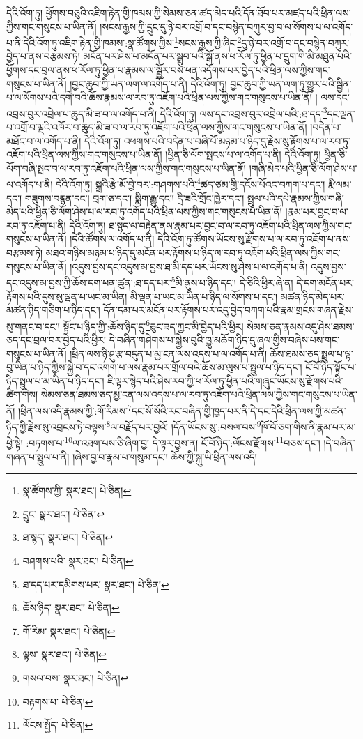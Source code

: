 དེའི་འོག་ཏུ། ཕྱོགས་བཅུའི་འཇིག་རྟེན་གྱི་ཁམས་ཀྱི་སེམས་ཅན་ཚད་མེད་པའི་དོན་ཐོབ་པར་མཛད་པའི་ཕྲིན་ལས་ཀྱིས་གང་གསུངས་པ་ཡིན་ནོ། །སངས་རྒྱས་ཀྱི་དྲུང་དུ་ཉེ་བར་འགྲོ་བ་དང་བསྙེན་བཀུར་བྱ་བ་ལ་སོགས་པ་ལ་འགོད་པ་ནི་དེའི་འོག་ཏུ་འཇིག་རྟེན་གྱི་ཁམས་:སྣ་ཚོགས་ཀྱིས་\footnote{སྣ་ཚོགས་ཀྱི་  སྣར་ཐང་།  པེ་ཅིན། }སངས་རྒྱས་ཀྱི་ཞིང་\footnote{དྲུང་  སྣར་ཐང་།  པེ་ཅིན། }དུ་ཉེ་བར་འགྲོ་བ་དང་བསྙེན་བཀུར་བྱེད་པ་ནས་བརྩམས་ཏེ། མངོན་པར་ཤེས་པ་མངོན་པར་སྒྲུབ་པའི་སྒོ་ནས་ཕ་རོལ་ཏུ་ཕྱིན་པ་དྲུག་གི་མི་མཐུན་པའི་ཕྱོགས་དང་བྲལ་ནས་ཕ་རོལ་ཏུ་ཕྱིན་པ་རྣམས་ལ་སྦྱོར་བས་ཕན་འདོགས་པར་བྱེད་པའི་ཕྲིན་ལས་ཀྱིས་གང་གསུངས་པ་ཡིན་ནོ། །བྱང་ཆུབ་ཀྱི་ཡན་ལག་ལ་འགོད་པ་ནི། དེའི་འོག་ཏུ། བྱང་ཆུབ་ཀྱི་ཡན་ལག་ཏུ་གྱུར་པའི་སྦྱིན་པ་ལ་སོགས་པའི་དགེ་བའི་ཆོས་རྣམས་ལ་རབ་ཏུ་འཇོག་པའི་ཕྲིན་ལས་ཀྱིས་གང་གསུངས་པ་ཡིན་ནོ། །
ལས་དང་འབྲས་བུར་འབྲེལ་པ་ཆུད་མི་ཟ་བ་ལ་འགོད་པ་ནི། དེའི་འོག་ཏུ། ལས་དང་འབྲས་བུར་འབྲེལ་པའི་:ཐ་དད་\footnote{ཐ་སྙད་  སྣར་ཐང་།  པེ་ཅིན། }དང་ལྡན་པ་འགྲོ་བ་ལྔའི་འཁོར་བ་ཆུད་མི་ཟ་བ་ལ་རབ་ཏུ་འཇོག་པའི་ཕྲིན་ལས་ཀྱིས་གང་གསུངས་པ་ཡིན་ནོ། །བདེན་པ་མཐོང་བ་ལ་འགོད་པ་ནི། དེའི་འོག་ཏུ། འཕགས་པའི་བདེན་པ་བཞི་པོ་མཉམ་པ་ཉིད་དུ་རྗེས་སུ་རྟོགས་པ་ལ་རབ་ཏུ་འཇོག་པའི་ཕྲིན་ལས་ཀྱིས་གང་གསུངས་པ་ཡིན་ནོ། །ཕྱིན་ཅི་ལོག་སྤངས་པ་ལ་འགོད་པ་ནི། དེའི་འོག་ཏུ། ཕྱིན་ཅི་ལོག་བཞི་སྤང་བ་ལ་རབ་ཏུ་འཇོག་པའི་ཕྲིན་ལས་ཀྱིས་གང་གསུངས་པ་ཡིན་ནོ། །གཞི་མེད་པའི་ཕྱིན་ཅི་ལོག་ཤེས་པ་ལ་འགོད་པ་ནི། དེའི་འོག་ཏུ། སྐྲའི་རྩེ་མོ་བྱེ་བར་:གཤགས་པའི་\footnote{བཤགས་པའི་  སྣར་ཐང་།  པེ་ཅིན། }ཚད་ཙམ་གྱི་དངོས་པོའང་བཀག་པ་དང་། རྨི་ལམ་དང་། གཟུགས་བརྙན་དང་། བྲག་ཅ་དང་། སྨིག་རྒྱུ་དང་། དྲི་ཟའི་གྲོང་ཁྱེར་དང་། སྤྲུལ་པའི་དཔེ་རྣམས་ཀྱིས་གཞི་མེད་པའི་ཕྱིན་ཅི་ལོག་ཤེས་པ་ལ་རབ་ཏུ་འགོད་པའི་ཕྲིན་ལས་ཀྱིས་གང་གསུངས་པ་ཡིན་ནོ། །རྣམ་པར་བྱང་བ་ལ་རབ་ཏུ་འཇོག་པ་ནི། དེའི་འོག་ཏུ། ཐ་སྙད་ལ་བརྟེན་ནས་རྣམ་པར་བྱང་བ་ལ་རབ་ཏུ་འཇོག་པའི་ཕྲིན་ལས་ཀྱིས་གང་གསུངས་པ་ཡིན་ནོ། །དེའི་ཚོགས་ལ་འགོད་པ་ནི། དེའི་འོག་ཏུ་ཚོགས་ཡོངས་སུ་རྫོགས་པ་ལ་རབ་ཏུ་འཇོག་པ་ནས་བརྩམས་ཏེ། མཐའ་གཉིས་མཉམ་པ་ཉིད་དུ་མངོན་པར་རྟོགས་པ་ཉིད་ལ་རབ་ཏུ་འཇོག་པའི་ཕྲིན་ལས་ཀྱིས་གང་གསུངས་པ་ཡིན་ནོ། །འདུས་བྱས་དང་འདུས་མ་བྱས་ཐ་མི་དད་པར་ཡོངས་སུ་ཤེས་པ་ལ་འགོད་པ་ནི། འདུས་བྱས་དང་འདུས་མ་བྱས་ཀྱི་ཆོས་དག་ཕན་ཚུན་:ཐ་དད་པར་\footnote{ཐ་དད་པར་དམིགས་པར་  སྣར་ཐང་།  པེ་ཅིན། }མི་ནུས་པ་ཉིད་དང་། དེ་ཅིའི་ཕྱིར་ཞེ་ན། དེ་དག་མངོན་པར་རྟོགས་པའི་དུས་སུ་ལྡན་པ་ཡང་མ་ཡིན། མི་ལྡན་པ་ཡང་མ་ཡིན་པ་ཉིད་ལ་སོགས་པ་དང་། མཚན་ཉིད་མེད་པར་མཚན་ཉིད་གཅིག་པ་ཉིད་དང་། དོན་དམ་པར་མངོན་པར་རྟོགས་པར་འདུ་བྱེད་བཀག་པའི་རྣམ་གྲངས་གཞན་རྗེས་སུ་གནང་བ་དང་། སྟོང་པ་ཉིད་ཀྱི་:ཆོས་ཉིད་དུ་\footnote{ཆོས་ཉིད་  སྣར་ཐང་།  པེ་ཅིན། }ཅུང་ཟད་ཀྱང་མི་བྱེད་པའི་ཕྱིར། སེམས་ཅན་རྣམས་འདུ་ཤེས་ཐམས་ཅད་དང་བྲལ་བར་བྱེད་པའི་ཕྱིར། དེ་བཞིན་གཤེགས་པ་སྐྱེས་བུའི་ཁྱུ་མཆོག་ཉིད་དུ་ཞལ་གྱིས་བཞེས་པས་གང་གསུངས་པ་ཡིན་ནོ། །ཕྲིན་ལས་ཉི་ཤུ་རྩ་བདུན་པ་མྱ་ངན་ལས་འདས་པ་ལ་འགོད་པ་ནི། ཆོས་ཐམས་ཅད་སྤྲུལ་པ་ལྟ་བུ་ཡིན་པ་ཉིད་ཀྱིས་སྐྱེ་བ་དང་འགག་པ་ལས་རྣམ་པར་གྲོལ་བའི་ཆོས་མ་ལུས་པ་སྤྲུལ་པ་ཉིད་དང་། ངོ་བོ་ཉིད་སྟོང་པ་ཉིད་སྤྲུལ་པ་མ་ཡིན་པ་ཉིད་དང་། ཇི་ལྟར་སྙེད་པའི་ཤེས་རབ་ཀྱི་ཕ་རོལ་ཏུ་ཕྱིན་པའི་གཞུང་ཡོངས་སུ་རྫོགས་པའི་ཚིག་གིས། སེམས་ཅན་ཐམས་ཅད་མྱ་ངན་ལས་འདས་པ་ལ་རབ་ཏུ་འཇོག་པའི་ཕྲིན་ལས་ཀྱིས་གང་གསུངས་པ་ཡིན་ནོ། །ཕྲིན་ལས་འདི་རྣམས་ཀྱི་:གོ་རིམས་\footnote{གོ་རིམ་  སྣར་ཐང་།  པེ་ཅིན། }དང་སོ་སོའི་རང་བཞིན་གྱི་ཁྱད་པར་ནི་དེ་དང་དེའི་ཕྲིན་ལས་ཀྱི་མཚན་ཉིད་ཀྱི་རྗེས་སུ་འབྲངས་ཏེ་བལྟས་\footnote{ལྟས་  སྣར་ཐང་།  པེ་ཅིན། }ལ་བརྗོད་པར་བྱའོ། །དོན་ཡོངས་སུ་:བསལ་བས་\footnote{གསལ་བས་  སྣར་ཐང་།  པེ་ཅིན། }ཁོ་བོ་ཅག་གིས་ནི་རྣམ་པར་མ་ཕྱེ་སྟེ། :བཏགས་པ་\footnote{བརྟགས་པ་  པེ་ཅིན། }ལ་འཐག་པས་ཅི་ཞིག་བྱ། དེ་ལྟར་བྱས་ན། ངོ་བོ་ཉིད་:ལོངས་རྫོགས་\footnote{ལོངས་སྤྱོད་  པེ་ཅིན། }བཅས་དང་། །དེ་བཞིན་གཞན་པ་སྤྲུལ་པ་ནི། །ཞེས་བྱ་བ་རྣམ་པ་གསུམ་དང་། ཆོས་ཀྱི་སྐུ་ཡི་ཕྲིན་ལས་འདི། 